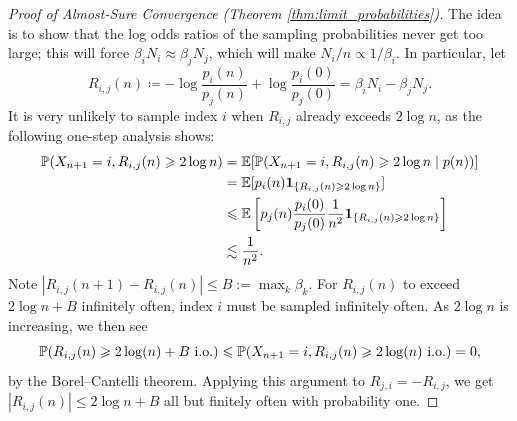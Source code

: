 \begin{proof}[Proof of Almost-Sure Convergence (Theorem \ref{thm:limit_probabilities})]
    The idea is to show that the log odds ratios of the sampling probabilities never get too large; this will force $\beta_i N_i \approx \beta_j N_j$, which will make $N_i/n \propto 1/\beta_i$. In particular, let
    $$R_{i,j}(n) \coloneqq -\log \frac{p_i(n)}{p_j(n)} + \log \frac{p_i(0)}{p_j(0)} = \beta_i N_i - \beta_j N_j.$$
    It is very unlikely to sample index $i$ when $R_{i,j}$ already exceeds $2\log n$, as the following one-step analysis shows:
    \begin{align*}
        \mathbb P(X_{n+1} = i, R_{i,j}(n) \geq 2 \log n) &= \E[ \mathbb P(X_{n+1} = i, R_{i,j}(n) \geq 2 \log n \mid p(n))] \\
        &= \mathbb E[p_i(n) \mathbf 1_{\{R_{i,j}(n) \geq 2 \log n\}}] \\
        &\leq \E \left[p_j(n) \frac{p_i(0)}{p_j(0)} \frac{1}{n^2} \mathbf 1_{\{R_{i,j}(n) \geq 2 \log n\}} \right] \\
        &\lesssim \frac{1}{n^2}.
    \end{align*}
    Note $|R_{i,j}(n+1) - R_{i,j}(n)| \leq B := \max_k \beta_k$. For $R_{i,j}(n)$
    to exceed $2\log n+B$ infinitely often, index $i$ must be sampled
    infinitely often. As $2\log n$ is increasing, we then see
    \[\P(R_{i,j}(n) \geq 2\log(n) + B \textrm{ i.o.}) \leq \P(X_{n+1} = i, R_{i,j}(n) \geq 2\log(n) \textrm{ i.o.}) = 0,\]
    \noindent by the Borel--Cantelli theorem. Applying this argument to $R_{j,i} = -R_{i,j}$, we get $|R_{i,j}(n)| \leq 2 \log n + B$ all but finitely often with probability one.


\end{proof}
